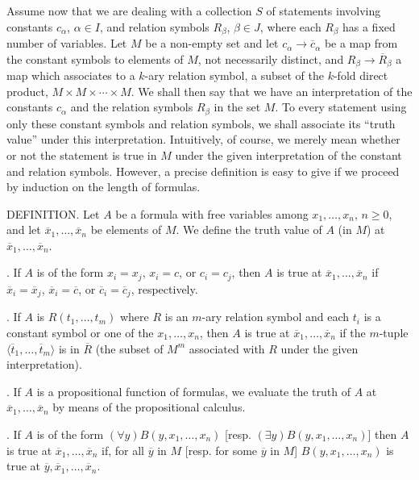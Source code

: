 \documentclass[12pt]{article}
\newcommand{\n}{\noindent}
\begin{document}
Assume now that we are dealing with a collection $S$ of statements involving constants $c_\alpha$, $\alpha\in I$, and relation symbols $R_\beta$, $\beta\in J$, where each $R_\beta$ has a fixed number of variables. Let $M$ be a non-empty set and let $c_\alpha\to\overline{c}_\alpha$ be a map from the constant symbols to elements of $M$, not necessarily distinct, and $R_\beta\to\overline{R}_\beta$ a map which associates to a $k$-ary relation symbol, a subset of the $k$-fold direct product, $M\times M\times\cdots\times M$. We shall then say that we have an interpretation of the constants $c_\alpha$ and the relation symbols $R_\beta$ in the set $M$. To every statement using only these constant symbols and relation symbols, we shall associate its ``truth value'' under this interpretation. Intuitively, of course, we merely mean whether or not the statement is true in $M$ under the given interpretation of the constant and relation symbols. However, a precise definition is easy to give if we proceed by induction on the length of formulas. 

\n DEFINITION. Let $A$ be a formula with free variables among $x_1,\dots,x_n$, $n \ge 0$, and let $\overline{x}_1, \dots, \overline{x}_n$ be elements of $M$. We define the truth value of $A$ (in $M$) at $\overline{x}_1,\dots,\overline{x}_n$.

\n 1. If $A$ is of the form $x_i=x_j$, $x_i=c$, or $c_i=c_j$, then $A$ is true at $\overline{x}_1,\dots,\overline{x}_n$ if $\overline{x}_i=\overline{x}_j$, $\overline{x}_i=\overline{c}$, or $\overline{c}_i=\overline{c}_j$, respectively. 

\n 2. If $A$ is $R(t_1,\dots,t_m)$ where $R$ is an $m$-ary relation symbol and each $t_i$ is a constant symbol or one of the $x_1,\dots,x_n$, then $A$ is true at $\overline{x}_1,\dots,\overline{x}_n$ if the $m$-tuple $\langle\overline{t}_1,\dots,\overline{t}_m\rangle$ is in $\overline{R}$ (the subset of $M^m$ associated with $R$ under the given interpretation).

\n 3. If $A$ is a propositional function of formulas, we evaluate the truth of $A$ at $\overline{x}_1,\dots,\overline{x}_n$ by means of the propositional calculus. 

\n 4. If $A$ is of the form $(\forall y)B(y,x_1,\dots,x_n)$ [resp. $(\exists y)B(y,x_1,\dots,x_n)$] then $A$ is true at $\overline{x}_1,\dots,\overline{x}_n$ if, for all $\overline{y}$ in $M$ [resp. for some $\overline{y}$ in $M$] $B(y,x_1,\dots,x_n)$ is true at $\overline{y},\overline{x}_1,\dots,\overline{x}_n$.\bigskip
\end{document}
